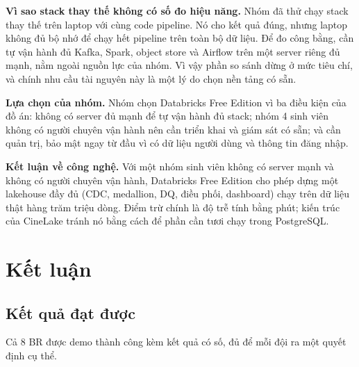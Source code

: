 \documentclass[a4paper,11pt]{article}
\begin{document}
\endgroup

\textbf{Vì sao stack thay thế không có số đo hiệu năng.} Nhóm đã thử chạy stack thay thế trên laptop với cùng code pipeline. Nó cho kết quả đúng, nhưng laptop không đủ bộ nhớ để chạy hết pipeline trên toàn bộ dữ liệu. Để đo công bằng, cần tự vận hành đủ Kafka, Spark, object store và Airflow trên một server riêng đủ mạnh, nằm ngoài nguồn lực của nhóm. Vì vậy phần so sánh dừng ở mức tiêu chí, và chính nhu cầu tài nguyên này là một lý do chọn nền tảng có sẵn.

\textbf{Lựa chọn của nhóm.} Nhóm chọn Databricks Free Edition vì ba điều kiện của đồ án: không có server đủ mạnh để tự vận hành đủ stack; nhóm 4 sinh viên không có người chuyên vận hành nên cần triển khai và giám sát có sẵn; và cần quản trị, bảo mật ngay từ đầu vì có dữ liệu người dùng và thông tin đăng nhập.

\textbf{Kết luận về công nghệ.} Với một nhóm sinh viên không có server mạnh và không có người chuyên vận hành, Databricks Free Edition cho phép dựng một lakehouse đầy đủ (CDC, medallion, DQ, điều phối, dashboard) chạy trên dữ liệu thật hàng trăm triệu dòng. Điểm trừ chính là độ trễ tính bằng phút; kiến trúc của CineLake tránh nó bằng cách để phần cần tươi chạy trong PostgreSQL.

\section{Kết luận}\label{sec:6}

\subsection{Kết quả đạt được}\label{sec:6.1}

Cả 8 BR được demo thành công kèm kết quả có số, đủ để mỗi đội ra một quyết định cụ thể.
\end{document}
